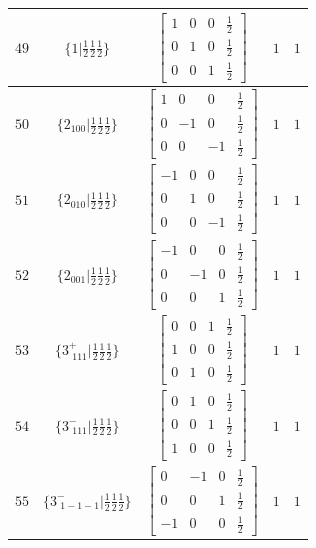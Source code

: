 \documentclass[fleqn,8pt]{jsarticle}
\begin{document}
\begin{longtable}{ccccc}
$ 49 $ & $ \{1|\frac{1}{2} \frac{1}{2} \frac{1}{2}\} $ & $ \begin{bmatrix} 1 & 0 & 0 & \frac{1}{2} \\ 0 & 1 & 0 & \frac{1}{2} \\ 0 & 0 & 1 & \frac{1}{2} \end{bmatrix} $ & $ 1 $ & $ 1 $ \\ \hline
$ 50 $ & $ \{2{}_{100}|\frac{1}{2} \frac{1}{2} \frac{1}{2}\} $ & $ \begin{bmatrix} 1 & 0 & 0 & \frac{1}{2} \\ 0 & -1 & 0 & \frac{1}{2} \\ 0 & 0 & -1 & \frac{1}{2} \end{bmatrix} $ & $ 1 $ & $ 1 $ \\ \hline
$ 51 $ & $ \{2{}_{010}|\frac{1}{2} \frac{1}{2} \frac{1}{2}\} $ & $ \begin{bmatrix} -1 & 0 & 0 & \frac{1}{2} \\ 0 & 1 & 0 & \frac{1}{2} \\ 0 & 0 & -1 & \frac{1}{2} \end{bmatrix} $ & $ 1 $ & $ 1 $ \\ \hline
$ 52 $ & $ \{2{}_{001}|\frac{1}{2} \frac{1}{2} \frac{1}{2}\} $ & $ \begin{bmatrix} -1 & 0 & 0 & \frac{1}{2} \\ 0 & -1 & 0 & \frac{1}{2} \\ 0 & 0 & 1 & \frac{1}{2} \end{bmatrix} $ & $ 1 $ & $ 1 $ \\ \hline
$ 53 $ & $ \{3^{+}_{\,\,111}|\frac{1}{2} \frac{1}{2} \frac{1}{2}\} $ & $ \begin{bmatrix} 0 & 0 & 1 & \frac{1}{2} \\ 1 & 0 & 0 & \frac{1}{2} \\ 0 & 1 & 0 & \frac{1}{2} \end{bmatrix} $ & $ 1 $ & $ 1 $ \\ \hline
$ 54 $ & $ \{3^{-}_{\,\,111}|\frac{1}{2} \frac{1}{2} \frac{1}{2}\} $ & $ \begin{bmatrix} 0 & 1 & 0 & \frac{1}{2} \\ 0 & 0 & 1 & \frac{1}{2} \\ 1 & 0 & 0 & \frac{1}{2} \end{bmatrix} $ & $ 1 $ & $ 1 $ \\ \hline
$ 55 $ & $ \{3^{-}_{\,\,1-1-1}|\frac{1}{2} \frac{1}{2} \frac{1}{2}\} $ & $ \begin{bmatrix} 0 & -1 & 0 & \frac{1}{2} \\ 0 & 0 & 1 & \frac{1}{2} \\ -1 & 0 & 0 & \frac{1}{2} \end{bmatrix} $ & $ 1 $ & $ 1 $ \\ \hline

\end{longtable}
\end{document}
